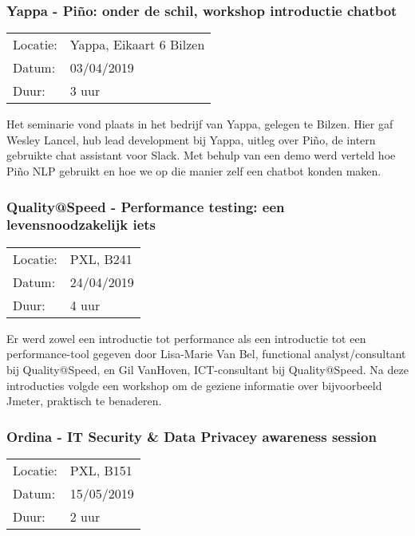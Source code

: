 \subsubsection{Yappa - Piño: onder de schil, workshop introductie chatbot}

\begin{tabular}{l l}
  Locatie: & Yappa, Eikaart 6 Bilzen\\
  Datum: & 03/04/2019\\
  Duur: & 3 uur
\end{tabular}

Het seminarie vond plaats in het bedrijf van Yappa, gelegen te Bilzen. Hier gaf Wesley Lancel, hub lead development bij Yappa, uitleg over Piño, de intern gebruikte chat assistant voor Slack. Met behulp van een demo werd verteld hoe Piño NLP gebruikt en hoe we op die manier zelf een chatbot konden maken.

\subsubsection{Quality@Speed - Performance testing: een levensnoodzakelijk iets}

\begin{tabular}{l l}
  Locatie: & PXL, B241\\
  Datum: & 24/04/2019\\
  Duur: & 4 uur
\end{tabular}

Er werd zowel een introductie tot performance als een introductie tot een performance\hyp{}tool gegeven door Lisa\hyp{}Marie Van Bel, functional analyst/consultant bij Quality@Speed, en Gil VanHoven, ICT\hyp{}consultant bij Quality@Speed. Na deze introducties volgde een workshop om de geziene informatie over bijvoorbeeld Jmeter, praktisch te benaderen.

\subsubsection{Ordina - IT Security \& Data Privacey awareness session}

\begin{tabular}{l l}
  Locatie: & PXL, B151\\
  Datum: & 15/05/2019\\
  Duur: & 2 uur
\end{tabular}

